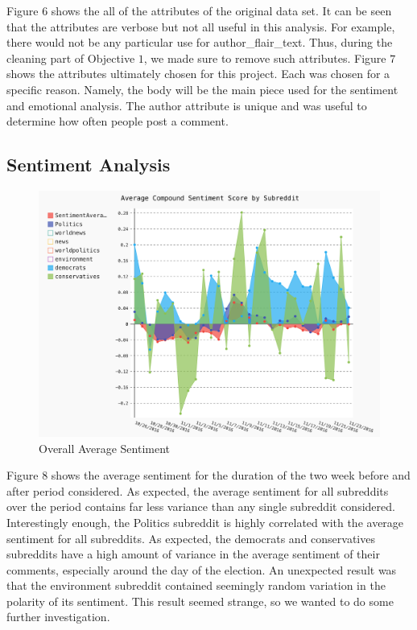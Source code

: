 \documentclass[letterpaper]{article}
\begin{document}
Figure $6$ shows the all of the attributes of the original data set. It can be seen that the attributes are verbose but not all useful in this analysis. For example, there would not be any particular use for author\_flair\_text. Thus, during the cleaning part of Objective $1$, we made sure to remove such attributes. Figure $7$ shows the attributes ultimately chosen for this project. Each was chosen for a specific reason. Namely, the body will be the main piece used for the sentiment and emotional analysis. The author attribute is unique and was useful to determine how often people post a comment.


\subsection{Sentiment Analysis}

\begin{figure}[!htb]
\begin{center}
\includegraphics[scale=0.2]{Images/avg-sentiment-stacked.png}
\caption{Overall Average Sentiment}
\label{fig1}
\end{center}
\end{figure}

Figure $8$ shows the average sentiment for the duration of the two week before and after period considered. As expected, the average sentiment for all subreddits over the period contains far less variance than any single subreddit considered. Interestingly enough, the Politics subreddit is highly correlated with the average sentiment for all subreddits. As expected, the democrats and conservatives subreddits have a high amount of variance in the average sentiment of their comments, especially around the day of the election. An unexpected result was that the environment subreddit contained seemingly random variation in the polarity of its sentiment. This result seemed strange, so we wanted to do some further investigation. 
\end{document}
